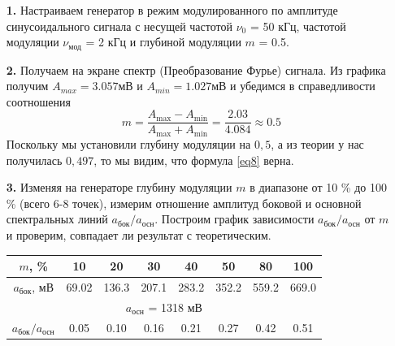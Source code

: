 \documentclass[a4paper,12pt]{article}
\begin{document}
\begin{enumerate}


\item [\textbf{1.}] Настраиваем генератор в режим модулированного по амплитуде синусоидального сигнала с несущей частотой $\nu_0$ = 50 кГц, частотой модуляции $\nu_\text{мод}$ = 2 кГц и глубиной модуляции $m$ = 0.5.

\item [\textbf{2.}] Получаем на экране спектр (Преобразование Фурье) сигнала. Из графика получим $A_{max} = 3.057 \text{мВ}$ и $A_{min} = 1.027 \text{мВ}$ и убедимся в справедливости соотношения $$ m = \frac{A_\text{max} - A_\text{min}}{A_\text{max} + A_\text{min}} = \frac{2.03}{4.084} \approx 0.5 $$
Поскольку мы установили глубину модуляции на $0,5$, а из теории у нас получилась $0,497$, то мы видим, что формула \ref{eq8} верна.

\item [\textbf{3.}]
Изменяя на генераторе глубину модуляции $m$ в диапазоне от 10 \% до 100 \% (всего 6-8 точек), измерим отношение амплитуд боковой и основной
спектральных линий $a_{\text{бок}}/a_{\text{осн}}$. Построим график зависимости $a_{\text{бок}}/a_{\text{осн}}$ от $m$ и проверим, совпадает ли
результат с теоретическим.

\begin{center}
\begin{tabular}{|c|c|c|c|c|c|c|c|}
\hline
$m$, \% & 10 & 20 & 30 & 40 & 50 & 80 & 100 \\ \hline
$a_{\text{бок}}$, мВ & 69.02 & 136.3 & 207.1 & 283.2 & 352.2 & 559.2 & 669.0 \\ \hline
\multicolumn{8}{|c|}{$a_{\text{осн}}$ = 1318 мВ} \\ \hline
$a_{\text{бок}}/a_{\text{осн}}$ & 0.05 & 0.10 & 0.16 & 0.21 & 0.27 & 0.42 & 0.51 \\ \hline
\end{tabular}


\end{center}
\end{enumerate}
\end{document}
